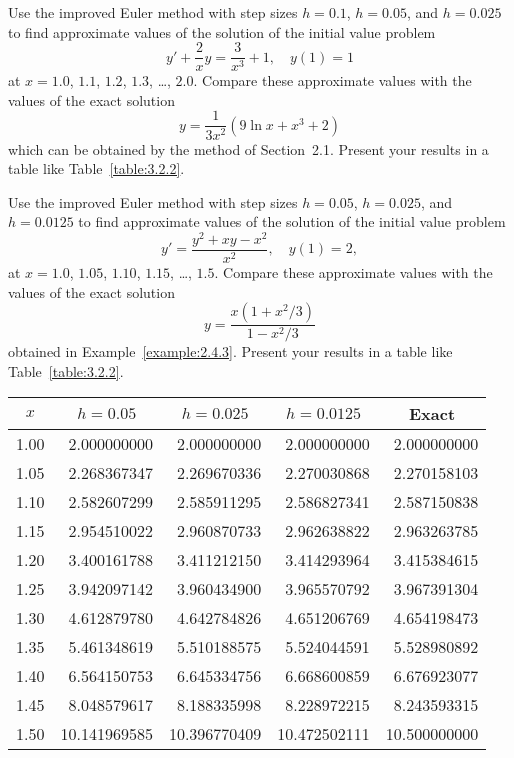 \documentclass{ximera}
\begin{document}
\begin{problem}\label{exer:3.2.7}
Use the improved Euler method with step sizes $h=0.1$, $h=0.05$, and
$h=0.025$ to find approximate values of the solution of the initial
value problem
$$
y'+\frac{2}{x}y=\frac{3}{x^3}+1,\quad y(1)=1
$$
at $x=1.0$, $1.1$, $1.2$, $1.3$, \dots, $2.0$. Compare these approximate
values with
the values of the exact solution
$$
y=\frac{1}{3x^2}(9\ln x+x^3+2)
$$
which can be obtained by the method of Section~2.1. Present
your results in a table like Table~\ref{table:3.2.2}.
\end{problem}

\begin{problem}\label{exer:3.2.8}
Use the improved Euler method with step sizes $h=0.05$, $h=0.025$, and
$h=0.0125$ to find approximate values of the solution of the initial
value problem
$$
y'=\frac{y^2+xy-x^2}{x^2},\quad y(1)=2,
$$
at $x=1.0$, $1.05$, $1.10$, $1.15$, \dots, $1.5$. Compare these approximate
values
with the values of the exact solution
$$
y=\frac{x(1+x^2/3)}{1-x^2/3}
$$
obtained in Example~\ref{example:2.4.3}. Present your results in a table
like Table~\ref{table:3.2.2}.

\begin{solution}
    {\small
\begin{tabular}{|c|r|r|r|r|}\hline
\multicolumn{1}{|c|}{$x$}&
\multicolumn{1}{|c|}{$h=0.05$}&
\multicolumn{1}{|c|}{$h=0.025$}&
\multicolumn{1}{|c|}{$h=0.0125$}&
\multicolumn{1}{|c|}{Exact}\\ \hline
1.00 & 2.000000000  &  2.000000000 &  2.000000000 &  2.000000000 \\
1.05 & 2.268367347  &  2.269670336 &  2.270030868 &  2.270158103 \\
1.10 & 2.582607299  &  2.585911295 &  2.586827341 &  2.587150838 \\
1.15 & 2.954510022  &  2.960870733 &  2.962638822 &  2.963263785 \\
1.20 & 3.400161788  &  3.411212150 &  3.414293964 &  3.415384615 \\
1.25 & 3.942097142  &  3.960434900 &  3.965570792 &  3.967391304 \\
1.30 & 4.612879780  &  4.642784826 &  4.651206769 &  4.654198473 \\
1.35 & 5.461348619  &  5.510188575 &  5.524044591 &  5.528980892 \\
1.40 & 6.564150753  &  6.645334756 &  6.668600859 &  6.676923077 \\
1.45 & 8.048579617  &  8.188335998 &  8.228972215 &  8.243593315 \\
1.50 &10.141969585  & 10.396770409 & 10.472502111 & 10.500000000 \\
\hline
\end{tabular}}
\end{solution}
\end{problem}
\end{document}
